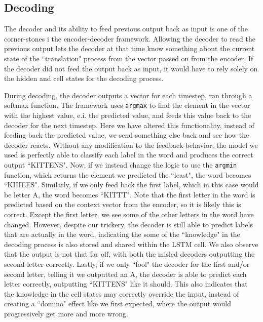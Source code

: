 
\subsection{Decoding}
The decoder and its ability to feed previous output back as input is one of the corner-stones i the encoder-decoder framework. Allowing the decoder to read the previous output lets the decoder at that time know something about the current state of the ``translation" process from the vector passed on from the encoder. If the decoder did not feed the output back as input, it would have to rely solely on the hidden and cell states for the decoding process.

During decoding, the decoder outputs a vector for each timestep, ran through a softmax function. The framework uses {\tt argmax} to find the element in the vector with the highest value, e.i. the predicted value, and feeds this value back to the decoder for the next timestep. Here we have altered this functionality, instead of feeding back the predicted value, we send something else back and see how the decoder reacts. Without any modification to the feedback-behavior, the model we used is perfectly able to classify each label in the word and produces the correct output ``KITTENS". Now, if we instead change the logic to use the {\tt argmin} function, which returns the element we predicted the ``least", the word becomes ``KIIIEES". Similarly, if we only feed back the first label, which in this case would be letter A, the word becomes ``KITTT". Note that the first letter in the word is predicted based on the context vector from the encoder, so it is likely this is correct. Except the first letter, we see some of the other letters in the word have changed. However, despite our trickery, the decoder is still able to predict labels that are actually in the word, indicating the some of the ``knowledge" in the decoding process is also stored and shared within the LSTM cell. We also observe that the output is not that far off, with both the misled decoders outputting the second letter correctly. Lastly, if we only ``fool" the decoder for the first and/or second letter, telling it we outputted an A, the decoder is able to predict each letter correctly, outputting ``KITTENS" like it should. This also indicates that the knowledge in the cell states may correctly override the input, instead of creating a ``domino" effect like we first expected, where the output would progressively get more and more wrong.

